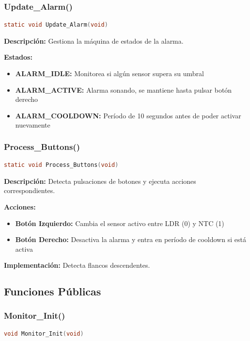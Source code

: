 \documentclass[12pt,a4paper]{article}
\begin{document}
\subsubsection{Update\_Alarm()}
\begin{lstlisting}[language=C, caption=Actualización del estado de alarma]
static void Update_Alarm(void)
\end{lstlisting}

\textbf{Descripción:} Gestiona la máquina de estados de la alarma.

\textbf{Estados:}
\begin{itemize}
    \item \textbf{ALARM\_IDLE:} Monitorea si algún sensor supera su umbral
    \item \textbf{ALARM\_ACTIVE:} Alarma sonando, se mantiene hasta pulsar botón derecho
    \item \textbf{ALARM\_COOLDOWN:} Período de 10 segundos antes de poder activar nuevamente
\end{itemize}

\subsubsection{Process\_Buttons()}
\begin{lstlisting}[language=C, caption=Procesamiento de entrada de botones]
static void Process_Buttons(void)
\end{lstlisting}

\textbf{Descripción:} Detecta pulsaciones de botones y ejecuta acciones correspondientes.

\textbf{Acciones:}
\begin{itemize}
    \item \textbf{Botón Izquierdo:} Cambia el sensor activo entre LDR (0) y NTC (1)
    \item \textbf{Botón Derecho:} Desactiva la alarma y entra en período de cooldown si está activa
\end{itemize}

\textbf{Implementación:} Detecta flancos descendentes.

\subsection{Funciones Públicas}

\subsubsection{Monitor\_Init()}
\begin{lstlisting}[language=C, caption=Inicialización del módulo]
void Monitor_Init(void)
\end{lstlisting}
\end{document}
